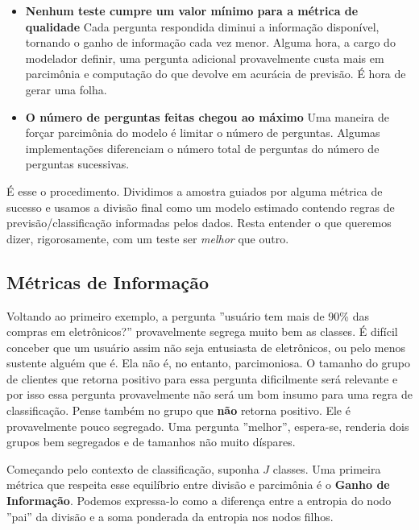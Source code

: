 \begin{itemize}
    \item \textbf{Nenhum teste cumpre um valor mínimo para a métrica de qualidade} \newline Cada pergunta respondida diminui a informação disponível, tornando o ganho de informação cada vez menor. Alguma hora, a cargo do modelador definir, uma pergunta adicional provavelmente custa mais em parcimônia e computação do que devolve em acurácia de previsão. É hora de gerar uma folha.
    
    \item \textbf{O número de perguntas feitas chegou ao máximo} \newline
    Uma maneira de forçar parcimônia do modelo é limitar o número de perguntas. Algumas implementações diferenciam o número total de perguntas do número de perguntas sucessivas.  
    
\end{itemize}

É esse o procedimento. Dividimos a amostra guiados por alguma métrica de sucesso e usamos a divisão final como um modelo estimado contendo regras de previsão/classificação informadas pelos dados. Resta entender o que queremos dizer, rigorosamente, com um teste ser \textit{melhor} que outro.


\subsection{Métricas de Informação}

Voltando ao primeiro exemplo, a pergunta ''usuário tem mais de 90\% das compras em eletrônicos?'' provavelmente segrega muito bem as classes. É difícil conceber que um usuário assim não seja entusiasta de eletrônicos, ou pelo menos sustente alguém que é. Ela não é, no entanto, parcimoniosa. O tamanho do grupo de clientes que retorna positivo para essa pergunta dificilmente será relevante e por isso essa pergunta provavelmente não será um bom insumo para uma regra de classificação. Pense também no grupo que \textbf{não} retorna positivo. Ele é provavelmente pouco segregado. Uma pergunta ''melhor'', espera-se, renderia dois grupos bem segregados e de tamanhos não muito díspares. 

Começando pelo contexto de classificação, suponha $J$ classes. Uma primeira métrica que respeita esse equilíbrio entre divisão e parcimônia é o \textbf{Ganho de Informação}. Podemos expressa-lo como a diferença entre a entropia do nodo ''pai'' da divisão e a soma ponderada da entropia nos nodos filhos. 

